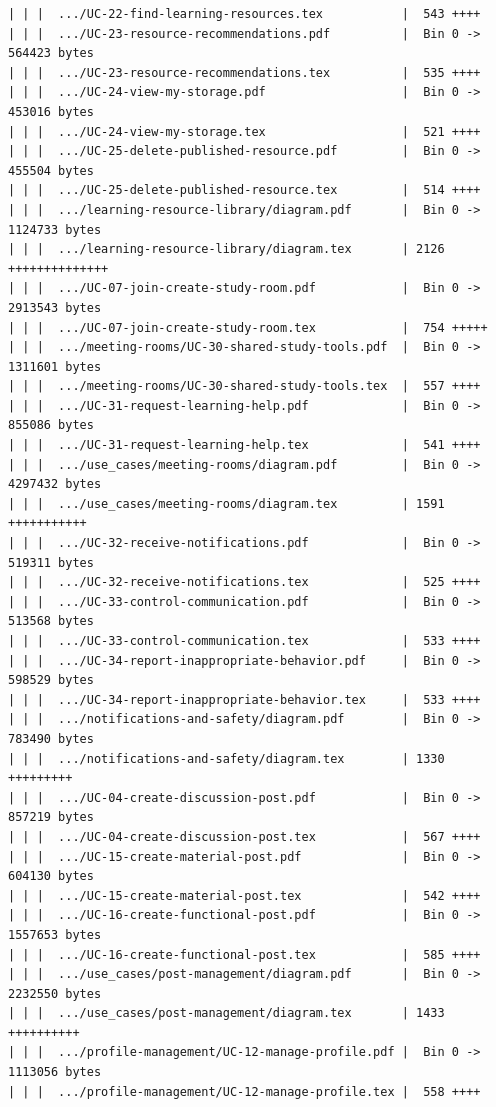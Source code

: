 \documentclass[12pt]{article}
\begin{document}
\begin{lstlisting}[numbers=none,breaklines=true]
| | |  .../UC-22-find-learning-resources.tex           |  543 ++++
| | |  .../UC-23-resource-recommendations.pdf          |  Bin 0 -> 564423 bytes
| | |  .../UC-23-resource-recommendations.tex          |  535 ++++
| | |  .../UC-24-view-my-storage.pdf                   |  Bin 0 -> 453016 bytes
| | |  .../UC-24-view-my-storage.tex                   |  521 ++++
| | |  .../UC-25-delete-published-resource.pdf         |  Bin 0 -> 455504 bytes
| | |  .../UC-25-delete-published-resource.tex         |  514 ++++
| | |  .../learning-resource-library/diagram.pdf       |  Bin 0 -> 1124733 bytes
| | |  .../learning-resource-library/diagram.tex       | 2126 ++++++++++++++
| | |  .../UC-07-join-create-study-room.pdf            |  Bin 0 -> 2913543 bytes
| | |  .../UC-07-join-create-study-room.tex            |  754 +++++
| | |  .../meeting-rooms/UC-30-shared-study-tools.pdf  |  Bin 0 -> 1311601 bytes
| | |  .../meeting-rooms/UC-30-shared-study-tools.tex  |  557 ++++
| | |  .../UC-31-request-learning-help.pdf             |  Bin 0 -> 855086 bytes
| | |  .../UC-31-request-learning-help.tex             |  541 ++++
| | |  .../use_cases/meeting-rooms/diagram.pdf         |  Bin 0 -> 4297432 bytes
| | |  .../use_cases/meeting-rooms/diagram.tex         | 1591 +++++++++++
| | |  .../UC-32-receive-notifications.pdf             |  Bin 0 -> 519311 bytes
| | |  .../UC-32-receive-notifications.tex             |  525 ++++
| | |  .../UC-33-control-communication.pdf             |  Bin 0 -> 513568 bytes
| | |  .../UC-33-control-communication.tex             |  533 ++++
| | |  .../UC-34-report-inappropriate-behavior.pdf     |  Bin 0 -> 598529 bytes
| | |  .../UC-34-report-inappropriate-behavior.tex     |  533 ++++
| | |  .../notifications-and-safety/diagram.pdf        |  Bin 0 -> 783490 bytes
| | |  .../notifications-and-safety/diagram.tex        | 1330 +++++++++
| | |  .../UC-04-create-discussion-post.pdf            |  Bin 0 -> 857219 bytes
| | |  .../UC-04-create-discussion-post.tex            |  567 ++++
| | |  .../UC-15-create-material-post.pdf              |  Bin 0 -> 604130 bytes
| | |  .../UC-15-create-material-post.tex              |  542 ++++
| | |  .../UC-16-create-functional-post.pdf            |  Bin 0 -> 1557653 bytes
| | |  .../UC-16-create-functional-post.tex            |  585 ++++
| | |  .../use_cases/post-management/diagram.pdf       |  Bin 0 -> 2232550 bytes
| | |  .../use_cases/post-management/diagram.tex       | 1433 ++++++++++
| | |  .../profile-management/UC-12-manage-profile.pdf |  Bin 0 -> 1113056 bytes
| | |  .../profile-management/UC-12-manage-profile.tex |  558 ++++

\end{lstlisting}
\end{document}
